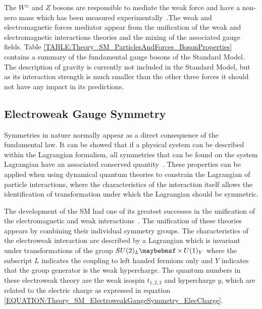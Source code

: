 The $W^{\pm}$ and $Z$ bosons are responsible to mediate the weak force and have a non-zero mass which has been measured experimentally~\cite{ARTICLE:TEVATRONcombinedWmass,ARTICLE:DELPHIMassZ,ARTICLE:PDG2014}.The weak and electromagnetic forces mediator appear from the unification of the weak and electromagnetic interactions theories and the mixing of the associated gauge fields. Table \ref{TABLE:Theory_SM_ParticlesAndForces_BosonProperties} contains a summary of the fundamental gauge bosons of the Standard Model. The description of gravity is currently not included in the Standard Model, but as its interaction strength is much smaller than the other three forces it should not have any impact in its predictions.



\subsection{Electroweak Gauge Symmetry}
\label{SUBSECTION:Theory_SM_ElectroweakGaugeSymmetry}


Symmetries in nature normally appear as a direct consequence of the fundamental law. It can be showed that if a physical system can be described within the Lagrangian formalism, all symmetries that can be found on the system Lagrangian have an associated conserved quantity~\cite{ARTICLE:InvariantVariationProblems}. These properties can be applied when using dynamical quantum theories to constrain the Lagrangian of particle interactions, where the characteristics of the interaction itself allows the identification of transformation under which the Lagrangian should be symmetric.

The development of the \gls{SM} had one of its greatest successes in the unification of the electromagnetic and weak interactions~\cite{ARTICLE:Glashow,ARTICLE:Weinberg,ARTICLE:Salam}. The unification of these theories appears by combining their individual symmetry groups. The characteristics of the electroweak interaction are described by a Lagrangian which is invariant under transformations of the group $\sutwol\times\uone$ where the subscript $L$ indicates the coupling to left handed fermions only and $Y$ indicates that the group generator is the weak hypercharge. The quantum numbers in these electroweak theory are the weak isospin $t_{1,2,3}$ and hypercharge $y$, which are related to the electric charge as expressed in equation \ref{EQUATION:Theory_SM_ElectroweakGaugeSymmetry_ElecCharge}.

